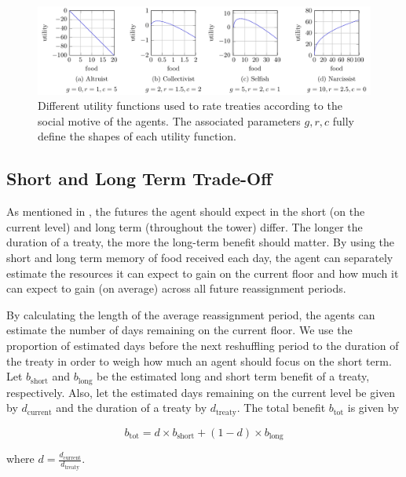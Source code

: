 \begin{figure}[htb]
    \centering
    \includegraphics[width=0.95\linewidth]{008_team_6_agent_design/utility_functions/utility_functions.pdf}
    \caption{Different utility functions used to rate treaties according to the social motive of the agents. The associated parameters $g,r,c$ fully define the shapes of each utility function.}
    \label{fig:utilities}
\end{figure}


\subsection{Short and Long Term Trade-Off}

As mentioned in , the futures the agent should expect in the short (on the current level) and long term (throughout the tower) differ. The longer the duration of a treaty, the more the long-term benefit should matter. By using the short and long term memory of food received each day, the agent can separately estimate the resources it can expect to gain on the current floor and how much it can expect to gain (on average) across all future reassignment periods.

By calculating the length of the average reassignment period, the agents can estimate the number of days remaining on the current floor. We use the proportion of estimated days before the next reshuffling period to the duration of the treaty in order to weigh how much an agent should focus on the short term. Let $b_\text{short}$ and $b_\text{long}$ be the estimated long and short term benefit of a treaty, respectively. Also, let the estimated days remaining on the current level be given by $d_\text{current}$ and the duration of a treaty by $d_\text{treaty}$. The total benefit $b_\text{tot}$ is given by

\begin{equation}
b_\text{tot} = d\times b_\text{short} + (1-d)\times b_\text{long}    
\label{eq:shortlongweight}
\end{equation}

where $d = \frac{d_\text{current}}{d_\text{treaty}}$.


